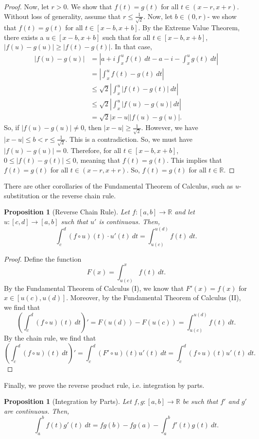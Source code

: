 \documentclass[a4paper, openany]{memoir}
\theoremstyle{definition}
\theoremstyle{plain}
\newtheorem{proposition}[definition]{Proposition}
\begin{document}
\begin{proof}
\noindent Now, let $r > 0$. We show that $f(t) = g(t)$ for all $t \in (x-r, x+r)$. Without loss of generality, assume that $r \leqslant \frac{1}{\sqrt{2}}$. Now, let $b \in (0, r)$- we show that $f(t) = g(t)$ for all $t \in [x-b, x+b]$. By the Extreme Value Theorem, there exists a $u \in [x-b, x+b]$ such that for all $t \in [x-b, x+b]$, $|f(u) - g(u)| \geqslant |f(t) - g(t)|$. In that case,
\begin{align*}
    |f(u) - g(u)| &= \left|a + i \int_x^u f(t) \ dt - a - i - \int_x^u g(t) \ dt\right| \\
    &= \left|\int_x^u f(t) - g(t) \ dt\right| \\
    &\leqslant \sqrt{2} \left|\int_x^u |f(t) - g(t)| \ dt\right| \\
    &\leqslant \sqrt{2} \left|\int_x^u |f(u) - g(u)| \ dt\right| \\
    &= \sqrt{2}|x - u||f(u) - g(u)|.
\end{align*}
So, if $|f(u) - g(u)| \neq 0$, then $|x - u| \geqslant \frac{1}{\sqrt{2}}$. However, we have $|x-u| \leqslant b < r \leqslant \frac{1}{\sqrt{2}}$. This is a contradiction. So, we must have $|f(u) - g(u)| = 0$. Therefore, for all $t \in [x-b, x+b]$, $0 \leqslant |f(t) - g(t)| \leqslant 0$, meaning that $f(t) = g(t)$. This implies that $f(t) = g(t)$ for all $t \in (x-r, x+r)$. So, $f(t) = g(t)$ for all $t \in \mathbb{R}$.
\end{proof}
\noindent There are other corollaries of the Fundamental Theorem of Calculus, such as $u$-substitution or the reverse chain rule.
\begin{proposition}[Reverse Chain Rule]
Let $f: [a, b] \to \mathbb{R}$ and let $u: [c, d] \to [a, b]$ such that $u'$ is continuous. Then,
\[\int_c^d (f \circ u)(t) \cdot u'(t) \ dt = \int_{u(c)}^{u(d)} f(t) \ dt.\]
\end{proposition}
\begin{proof}
Define the function
\[F(x) = \int_{u(c)}^{x} f(t) \ dt.\]
By the Fundamental Theorem of Calculus (I), we know that $F'(x) = f(x)$ for $x \in [u(c), u(d)]$. Moreover, by the Fundamental Theorem of Calculus (II), we find that
\[\left(\int_c^d (f \circ u)(t) \ dt\right)' = F(u(d)) - F(u(c)) = \int_{u(c)}^{u(d)} f(t) \ dt.\]
By the chain rule, we find that
\[\left(\int_c^d (f \circ u)(t) \ dt\right)' = \int_c^d (F' \circ u)(t)  u'(t) \ dt = \int_c^d (f \circ u)(t) u'(t) \ dt.\]
\end{proof}
\noindent Finally, we prove the reverse product rule, i.e. integration by parts.
\begin{proposition}[Integration by Parts]
Let $f, g: [a, b] \to \mathbb{R}$ be such that $f'$ and $g'$ are continuous. Then,
\[\int_a^b f(t) g'(t) \ dt = fg(b) - fg(a) - \int_a^b f'(t) g(t) \ dt. \]
\end{proposition}
\end{document}
